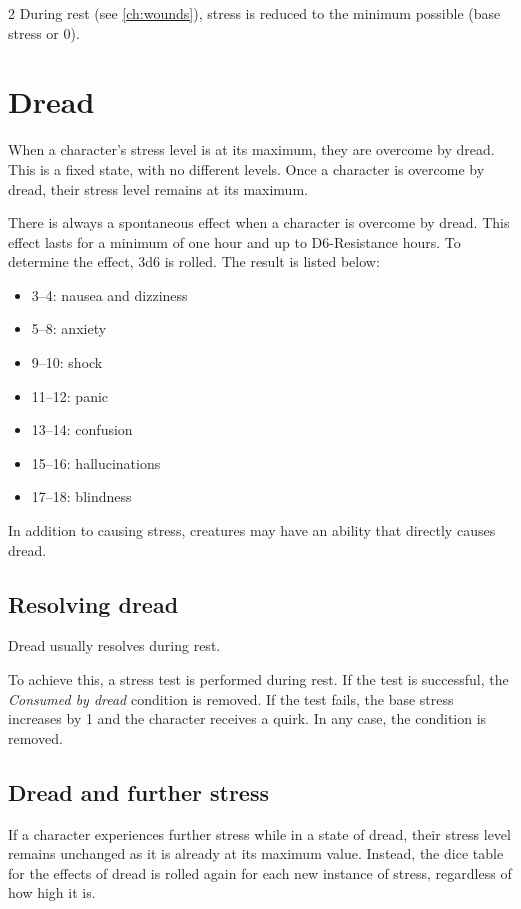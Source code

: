 \begin{multicols}{2}
During rest (see \cref{ch:wounds}), stress is reduced to the minimum possible (base stress or 0).

\section{Dread}

When a character's stress level is at its maximum, they are overcome by dread. This is a fixed state, with no different levels. Once a character is overcome by dread, their stress level remains at its maximum.

There is always a spontaneous effect when a character is overcome by dread. This effect lasts for a minimum of one hour and up to D6-Resistance hours. To determine the effect, 3d6 is rolled. The result is listed below:
\begin{itemize}
    \item 3–4: nausea and dizziness
    \item 5–8: anxiety
    \item 9–10: shock
    \item 11–12: panic
    \item 13–14: confusion
    \item 15–16: hallucinations
    \item 17–18: blindness
\end{itemize}

In addition to causing stress, creatures may have an ability that directly causes dread.

\subsection{Resolving dread}

Dread usually resolves during rest.

To achieve this, a stress test is performed during rest. If the test is successful, the \textit{Consumed by dread} condition is removed. If the test fails, the base stress increases by 1 and the character receives a quirk. In any case, the condition is removed.

\subsection{Dread and further stress}

If a character experiences further stress while in a state of dread, their stress level remains unchanged as it is already at its maximum value. Instead, the dice table for the effects of dread is rolled again for each new instance of stress, regardless of how high it is.


\end{multicols}
